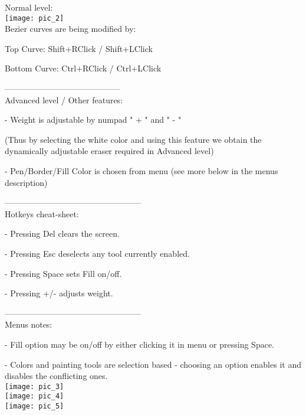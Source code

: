Normal level: \\

\texttt{[image: pic\_2]} \\

Bezier curves are being modified by:

Top Curve: Shift+RClick / Shift+LClick

Bottom Curve: Ctrl+RClick / Ctrl+LClick 


------------------------------------------ \\


Advanced level / Other features:

- Weight is adjustable by numpad " + " and " - " 

(Thus by selecting the white color and using this feature we obtain the dynamically adjustable eraser required in Advanced level)

- Pen/Border/Fill Color is chosen from menu (see more below in the menus description)


-------------------------------------------------- \\

Hotkeys cheat-sheet:

- Pressing Del clears the screen.

- Pressing Esc deselects any tool currently enabled.

- Pressing Space sets Fill on/off.

- Pressing +/- adjusts weight. 

-------------------------------------------------- \\

Menus notes:

- Fill option may be on/off by either clicking it in menu or pressing Space.

- Colors and painting tools are selection based - choosing an option enables it and disables the conflicting ones. \\


\texttt{[image: pic\_3]} \\

\texttt{[image: pic\_4]} \\

\texttt{[image: pic\_5]} 



\clearpage